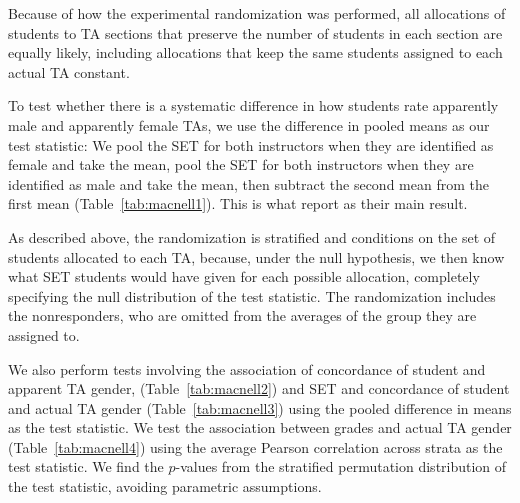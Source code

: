 \documentclass[12pt]{article}
\begin{document}
Because of how the experimental randomization was performed, all allocations of students to 
TA sections that preserve the number of students in each section are equally likely,  
including allocations that keep the same students assigned to each actual TA constant.

To test whether there is a systematic difference in how students rate apparently male and 
apparently female TAs, we use the difference in pooled means as our test statistic:
We pool the SET for both instructors when they are identified as female
and take the mean, pool the SET for both instructors when they are identified as male
and take the mean, then subtract the second mean from the first mean
(Table~\ref{tab:macnell1}).
This is what \cite{MacNell2014} report as their main result.

As described above, the randomization is stratified and conditions on the set of students 
allocated to each TA, because, under the null hypothesis, we then know what 
SET students would have given for each possible allocation, completely specifying the
null distribution of the test statistic.
The randomization includes the nonresponders, who are omitted from the averages of the
group they are assigned to.

We also perform tests involving the association of concordance of student and apparent 
TA gender,
(Table~\ref{tab:macnell2}) and SET and concordance of student and actual TA gender 
(Table~\ref{tab:macnell3}) using the pooled difference in means as the test statistic.
We test the association between grades and actual TA gender (Table~\ref{tab:macnell4}) 
using the average Pearson correlation across strata as the test statistic.
We find the $p$-values from the stratified permutation distribution of the test statistic,
avoiding parametric assumptions.
\end{document}
